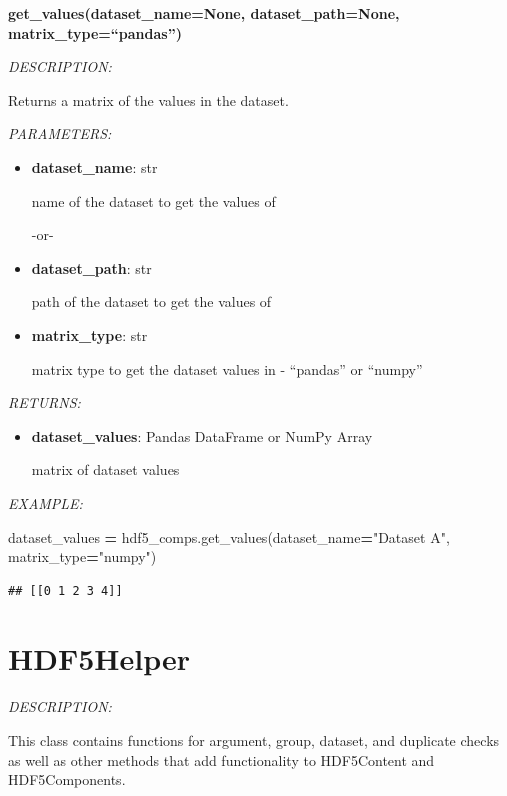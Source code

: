 \documentclass[
]{article}
\newenvironment{Shaded}{\begin{snugshade}}{\end{snugshade}}
\newcommand{\NormalTok}[1]{#1}
\newcommand{\OperatorTok}[1]{\textcolor[rgb]{0.81,0.36,0.00}{\textbf{#1}}}
\newcommand{\StringTok}[1]{\textcolor[rgb]{0.31,0.60,0.02}{#1}}
\begin{document}
\textbf{get\_values(dataset\_name=None, dataset\_path=None, matrix\_type=``pandas'')}

\emph{DESCRIPTION:}

Returns a matrix of the values in the dataset.

\emph{PARAMETERS:}

\begin{itemize}
\item
  \textbf{dataset\_name}: str

  name of the dataset to get the values of

  -or-
\item
  \textbf{dataset\_path}: str

  path of the dataset to get the values of
\item
  \textbf{matrix\_type}: str

  matrix type to get the dataset values in - ``pandas'' or ``numpy''
\end{itemize}

\emph{RETURNS:}

\begin{itemize}
\item
  \textbf{dataset\_values}: Pandas DataFrame or NumPy Array

  matrix of dataset values
\end{itemize}

\emph{EXAMPLE:}

\begin{Shaded}
\begin{Highlighting}[]
\NormalTok{dataset_values }\OperatorTok{=}\NormalTok{ hdf5_comps.get_values(dataset_name}\OperatorTok{=}\StringTok{"Dataset A"}\NormalTok{, matrix_type}\OperatorTok{=}\StringTok{"numpy"}\NormalTok{)}
\end{Highlighting}
\end{Shaded}

\begin{verbatim}
## [[0 1 2 3 4]]
\end{verbatim}

\hypertarget{hdf5helper}{%
\section{HDF5Helper}\label{hdf5helper}}

\emph{DESCRIPTION:}

This class contains functions for argument, group, dataset, and duplicate checks as well as other
methods that add functionality to HDF5Content and HDF5Components.
\end{document}
